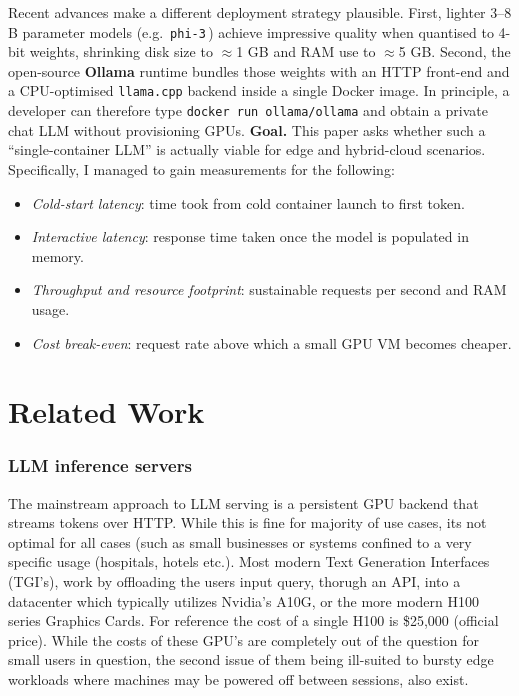 \documentclass[conference]{IEEEtran}
\begin{document}
Recent advances make a different deployment strategy plausible.  
First, lighter 3–8 B parameter models (e.g.\ \texttt{phi-3}\,\cite{phi3}) achieve impressive quality when quantised to 4-bit weights, shrinking disk size to \(\approx\)1 GB and RAM use to \(\approx\)5 GB.  
Second, the open-source \textbf{Ollama} runtime bundles those weights with an HTTP front-end and a CPU-optimised \texttt{llama.cpp} backend inside a single Docker image.  
In principle, a developer can therefore type \texttt{docker run ollama/ollama} and obtain a private chat LLM without provisioning GPUs.
\vspace{0.3em}
\noindent\textbf{Goal.}  
This paper asks whether such a “single-container LLM” is actually viable for edge and hybrid-cloud scenarios.  
Specifically, I managed to gain measurements for the following:

\begin{itemize}
  \item \textit{Cold-start latency}: time took from cold container launch to first token.
  \item \textit{Interactive latency}: response time taken once the model is populated in memory.
  \item \textit{Throughput and resource footprint}: sustainable requests per second and RAM usage.
  \item \textit{Cost break-even}: request rate above which a small GPU VM becomes cheaper.
\end{itemize}


\section{Related Work}\label{sec:related}

\subsubsection*{LLM inference servers}
The mainstream approach to LLM serving is a persistent GPU backend that streams tokens over HTTP. While this is fine for majority of use cases, its not optimal for all cases (such as small businesses or systems confined to a very specific usage (hospitals, hotels etc.). Most modern Text Generation Interfaces (TGI's), work by offloading the users input query, thorugh an API, into a datacenter which typically utilizes Nvidia's A10G, or the more modern H100 series Graphics Cards. For reference the cost of a single H100 is \$25,000 (official price). While the costs of these GPU's are completely out of the question for small users in question, the second issue of them being ill-suited to bursty edge workloads where machines may be powered off between sessions, also exist.
\end{document}
